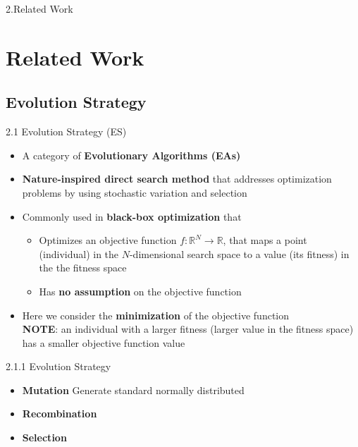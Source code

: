 \documentclass{beamer}
\begin{document}
\begin{frame}[plain,c]
\begin{center}
\Huge 2.Related Work
\end{center}
\end{frame}
\section{Related Work}


\subsection{Evolution Strategy}
\begin{frame}{2.1 Evolution Strategy (ES)}
\begin{itemize}
    \item A category of \textbf{Evolutionary Algorithms (EAs)}
    \item \textbf{Nature-inspired direct search method} that addresses optimization problems by using stochastic variation and selection 
    \item Commonly used in \textbf{black-box optimization} that
    \begin{itemize}
        \item Optimizes an objective function $f:\mathbb{R}^N \rightarrow \mathbb{R}$, that maps a point (individual) in the $N$-dimensional search space to a value (its fitness) in the the fitness space
        \item Has \textbf{no assumption} on the objective function
    \end{itemize}
    \item  Here we consider the \textbf{minimization} of the objective function  \\
    \textbf{NOTE}: an individual with a larger fitness (larger value in the fitness space) has a smaller objective function value

    
\end{itemize}
\end{frame}

\begin{frame}{2.1.1 Evolution Strategy}
\begin{itemize}
    \item \textbf{Mutation}  
    Generate standard normally distributed 
    \item \textbf{Recombination}
    
    \item \textbf{Selection} 
\end{itemize}
\end{frame}
\end{document}
